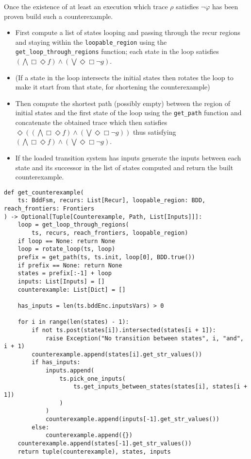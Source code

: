 \documentclass[11pt]{article}
\newcommand{\minline}[1]{{\footnotesize \texttt{#1}}}
\begin{document}
Once the existence of at least an execution which trace $\rho$ satisfies
$\neg\varphi$ has been proven build such a counterexample.
\begin{itemize}
	\item First compute a list of states looping and passing through the recur
	      regions and staying within the \minline{loopable_region} using the\\
	      \minline{get_loop_through_regions} function; each state in the loop
	      satisfies
	      $(\bigwedge \Box\Diamond f) \wedge (\bigvee \Diamond\Box \neg g)$.
	\item (If a state in the loop intersects the initial states then rotates the
	      loop to make it start from that state, for shortening the
	      counterexample)
	\item Then compute the shortest path (possibly empty) between the region of
	      initial states and the first state of the loop  using the
	      \minline{get_path} function and concatenate the obtained trace which
	      then satisfies
	      $\Diamond((\bigwedge \Box\Diamond f) \wedge (\bigvee \Diamond\Box \neg g))$
	      thus satisfying
	      $(\bigwedge \Box\Diamond f) \wedge (\bigvee \Diamond\Box \neg g)$.
	\item If the loaded transition system has inputs generate the inputs between
	      each state and its successor in the list of states computed and return
	      the built counterexample.
\end{itemize}

\begin{verbatim}
def get_counterexample(
    ts: BddFsm, recurs: List[Recur], loopable_region: BDD, reach_frontiers: Frontiers
) -> Optional[Tuple[Counterexample, Path, List[Inputs]]]:
    loop = get_loop_through_regions(
        ts, recurs, reach_frontiers, loopable_region)
    if loop == None: return None
    loop = rotate_loop(ts, loop)
    prefix = get_path(ts, ts.init, loop[0], BDD.true())
    if prefix == None: return None
    states = prefix[:-1] + loop
    inputs: List[Inputs] = []
    counterexample: List[Dict] = []

    has_inputs = len(ts.bddEnc.inputsVars) > 0

    for i in range(len(states) - 1):
        if not ts.post(states[i]).intersected(states[i + 1]):
            raise Exception("No transition between states", i, "and", i + 1)
        counterexample.append(states[i].get_str_values())
        if has_inputs:
            inputs.append(
                ts.pick_one_inputs(
                    ts.get_inputs_between_states(states[i], states[i + 1])
                )
            )
            counterexample.append(inputs[-1].get_str_values())
        else:
            counterexample.append({})
    counterexample.append(states[-1].get_str_values())
    return tuple(counterexample), states, inputs
\end{verbatim}
\end{document}
